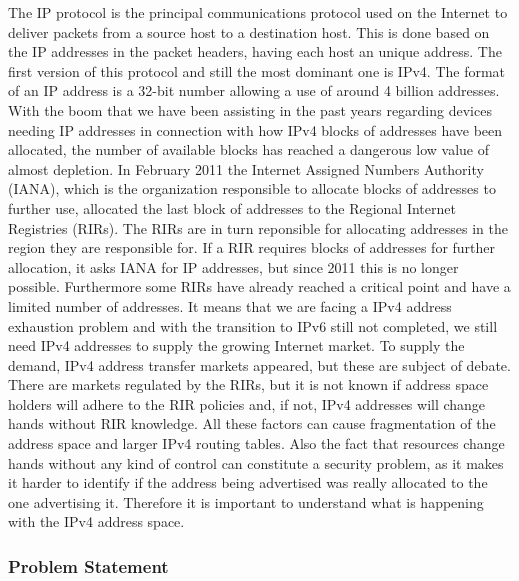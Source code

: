 \documentclass[11pt,a4paper]{scrreprt}
\begin{document}
The IP protocol is the principal communications protocol used on the Internet to deliver packets from a source host to a destination host. This is done based on the IP addresses in the packet headers, having each host an unique address. 
The first version of this protocol and still the most dominant one is IPv4. The format of an IP address is a 32-bit number allowing a use of around 4 billion addresses. With the boom that we have been assisting in the past years regarding devices needing IP addresses in connection with how IPv4 blocks of addresses have been allocated, the number of available blocks has reached a dangerous low value of almost depletion.      
In February 2011 the Internet Assigned Numbers Authority (IANA), which is the organization responsible to allocate blocks of addresses to further use, allocated the last block of addresses to the Regional Internet Registries (RIRs). The RIRs are in turn reponsible for allocating addresses in the region they are responsible for. If a RIR requires blocks of addresses for further allocation, it asks IANA for IP addresses, but since 2011 this is no longer possible. Furthermore some RIRs have already reached a critical point and have a limited number of addresses. It means that we are facing a IPv4 address exhaustion problem and with the transition to IPv6 still not completed, we still need IPv4 addresses to supply the growing Internet market. To supply the demand, IPv4 address transfer markets appeared, but these are subject of debate. There are markets regulated by the RIRs, but it is not known if address space holders will adhere to the RIR policies and, if not, IPv4 addresses will change hands without RIR knowledge.
All these factors can cause fragmentation of the address space and larger IPv4 routing tables. Also the fact that resources change hands without any kind of control can constitute a security problem, as it makes it harder to identify if the address being advertised was really allocated to the one advertising it. 
Therefore it is important to understand what is happening with the IPv4 address space. 

\subsubsection{Problem Statement}
\end{document}
